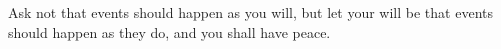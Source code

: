 Ask not that events should happen as you will, but let your will be that events
should happen as they do, and you shall have peace.
